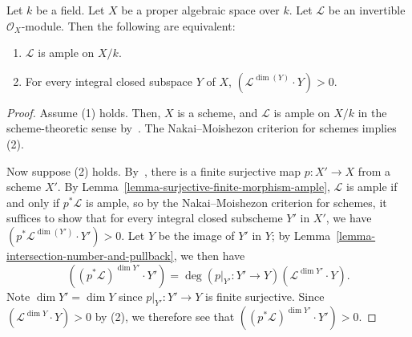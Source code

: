 \begin{theorem}
Let $k$ be a field.
Let $X$ be a proper algebraic space over $k$.
Let $\mathcal{L}$ be an invertible $\mathcal{O}_X$-module.
Then the following are equivalent:
\begin{enumerate}
  \item $\mathcal{L}$ is ample on $X/k$.
  \item For every integral closed subspace $Y$ of $X$,
    $(\mathcal{L}^{\dim(Y)} \cdot Y) > 0$.
\end{enumerate}
\end{theorem}
\begin{proof}
  Assume (1) holds. Then, $X$ is a scheme, and $\mathcal{L}$ is ample on $X/k$
  in the scheme-theoretic sense by~.
  The Nakai--Moishezon criterion for schemes implies (2).

  Now suppose (2) holds.
  By~, there is a finite surjective map $p : X' \to X$ from a
  scheme $X'$.
  By Lemma~\ref{lemma-surjective-finite-morphism-ample}, $\mathcal{L}$ is
  ample if and only if $p^*\mathcal{L}$ is ample, so by the Nakai--Moishezon
  criterion for schemes, it suffices to show that for every integral closed
  subscheme $Y'$ in $X'$, we have $(p^*\mathcal{L}^{\dim(Y')} \cdot Y') > 0$.
  Let $Y$ be the image of $Y'$ in $Y$;
  by Lemma~\ref{lemma-intersection-number-and-pullback}, we then have
  $$
  ( (p^*\mathcal{L})^{\dim Y'} \cdot Y') = \deg(p\rvert_{Y'} : Y' \to
  Y)(\mathcal{L}^{\dim Y'} \cdot Y).
  $$
  Note $\dim Y' = \dim Y$ since $p\rvert_{Y'} : Y' \to Y$ is finite surjective.
  Since $(\mathcal{L}^{\dim Y} \cdot Y) > 0$ by (2), we therefore see that
  $( (p^*\mathcal{L})^{\dim Y'} \cdot Y') > 0$.
\end{proof}





